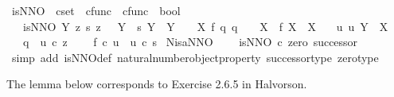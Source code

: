 \begin{isabellebody}
\endisatagproof
{\isafoldproof}%
%
\isadelimproof
\isanewline
%
\endisadelimproof
\isanewline
{}\isamarkupfalse%
\ is{\isacharunderscore}{\kern0pt}NNO\ {\isacharcolon}{\kern0pt}{\isacharcolon}{\kern0pt}\ {\isachardoublequoteopen}cset\ {\isasymRightarrow}\ cfunc\ {\isasymRightarrow}\ cfunc\ {\isasymRightarrow}\ bool{\isachardoublequoteclose}\ \ \isanewline
\ \ \ {\isachardoublequoteopen}is{\isacharunderscore}{\kern0pt}NNO\ Y\ z\ s\ {\isasymlongleftrightarrow}{\isacharparenleft}{\kern0pt}z{\isacharcolon}{\kern0pt}\ {\isasymone}\ {\isasymrightarrow}\ Y\ {\isasymand}\ s{\isacharcolon}{\kern0pt}\ Y\ {\isasymrightarrow}\ Y\ \ {\isasymand}\ {\isacharparenleft}{\kern0pt}{\isasymforall}\ X\ f\ q{\isachardot}{\kern0pt}\ {\isacharparenleft}{\kern0pt}{\isacharparenleft}{\kern0pt}q\ {\isacharcolon}{\kern0pt}\ {\isasymone}\ {\isasymrightarrow}\ X{\isacharparenright}{\kern0pt}\ {\isasymand}\ {\isacharparenleft}{\kern0pt}f{\isacharcolon}{\kern0pt}\ X\ {\isasymrightarrow}\ X{\isacharparenright}{\kern0pt}{\isacharparenright}{\kern0pt}{\isasymlongrightarrow}\isanewline
\ \ \ {\isacharparenleft}{\kern0pt}{\isasymexists}{\isacharbang}{\kern0pt}u{\isachardot}{\kern0pt}\ u{\isacharcolon}{\kern0pt}\ Y\ {\isasymrightarrow}\ X\ {\isasymand}\isanewline
\ \ \ q\ {\isacharequal}{\kern0pt}\ u\ {\isasymcirc}\isactrlsub c\ z\ {\isasymand}\isanewline
\ \ \ f\ {\isasymcirc}\isactrlsub c\ u\ {\isacharequal}{\kern0pt}\ u\ {\isasymcirc}\isactrlsub c\ s{\isacharparenright}{\kern0pt}{\isacharparenright}{\kern0pt}{\isacharparenright}{\kern0pt}{\isachardoublequoteclose}\isanewline
\isanewline
{}\isamarkupfalse%
\ N{\isacharunderscore}{\kern0pt}is{\isacharunderscore}{\kern0pt}a{\isacharunderscore}{\kern0pt}NNO{\isacharcolon}{\kern0pt}\isanewline
\ \ \ \ {\isachardoublequoteopen}is{\isacharunderscore}{\kern0pt}NNO\ {\isasymnat}\isactrlsub c\ zero\ successor{\isachardoublequoteclose}\isanewline
%
\isadelimproof
%
\endisadelimproof
%
\isatagproof
{}\isamarkupfalse%
\ {\isacharparenleft}{\kern0pt}simp\ add{\isacharcolon}{\kern0pt}\ is{\isacharunderscore}{\kern0pt}NNO{\isacharunderscore}{\kern0pt}def\ natural{\isacharunderscore}{\kern0pt}number{\isacharunderscore}{\kern0pt}object{\isacharunderscore}{\kern0pt}property\ successor{\isacharunderscore}{\kern0pt}type\ zero{\isacharunderscore}{\kern0pt}type{\isacharparenright}{\kern0pt}%
\endisatagproof
{\isafoldproof}%
%
\isadelimproof
%
\endisadelimproof
%
\begin{isamarkuptext}%
The lemma below corresponds to Exercise 2.6.5 in Halvorson.%
\end{isamarkuptext}\isamarkuptrue%

\end{isabellebody}
